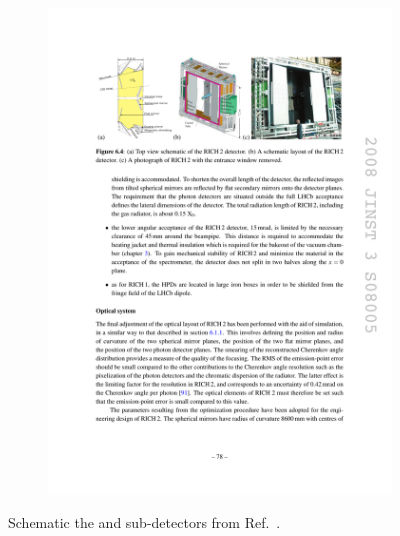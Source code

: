 \begin{figure}[!h]
\begin{subfigure}[t]{0.4\textwidth}
        \includegraphics[width=1.0\textwidth]{figs/Detector/richtwo_layout.pdf}
        \caption{\richtwo}
    \end{subfigure}
    \caption{Schematic the \richone and \richtwo sub-detectors from Ref.~\cite{Alves:2008zz}.}

    \label{fig:Dec_rich_layout}   
\end{figure}

\subsubsection{\richone}
\subsubsection{\richtwo}



